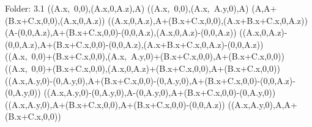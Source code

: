 Folder: 3.1
\left(\left(A.x,\ 0,0\right),\left(A.x,0,A.z\right),A\right)
\left(\left(A.x,\ 0,0\right),\left(A.x,\ A.y,0\right),A\right)
\left(A,A+\left(B.x+C.x,0,0\right),\left(A.x,0,A.z\right)\right)
\left(\left(A.x,0,A.z\right),A+\left(B.x+C.x,0,0\right),\left(A.x+B.x+C.x,0,A.z\right)\right)
\left(A-\left(0,0,A.z\right),A+\left(B.x+C.x,0,0\right)-\left(0,0,A.z\right),\left(A.x,0,A.z\right)-\left(0,0,A.z\right)\right)
\left(\left(A.x,0,A.z\right)-\left(0,0,A.z\right),A+\left(B.x+C.x,0,0\right)-\left(0,0,A.z\right),\left(A.x+B.x+C.x,0,A.z\right)-\left(0,0,A.z\right)\right)
\left(\left(A.x,\ 0,0\right)+\left(B.x+C.x,0,0\right),\left(A.x,\ A.y,0\right)+\left(B.x+C.x,0,0\right),A+\left(B.x+C.x,0,0\right)\right)
\left(\left(A.x,\ 0,0\right)+\left(B.x+C.x,0,0\right),\left(A.x,0,A.z\right)+\left(B.x+C.x,0,0\right),A+\left(B.x+C.x,0,0\right)\right)
\left(\left(A.x,A.y,0\right)-\left(0,A.y,0\right),A+\left(B.x+C.x,0,0\right)-\left(0,A.y,0\right),A+\left(B.x+C.x,0,0\right)-\left(0,0,A.z\right)-\left(0,A.y,0\right)\right)
\left(\left(A.x,A.y,0\right)-\left(0,A.y,0\right),A-\left(0,A.y,0\right),A+\left(B.x+C.x,0,0\right)-\left(0,A.y,0\right)\right)
\left(\left(A.x,A.y,0\right),A+\left(B.x+C.x,0,0\right),A+\left(B.x+C.x,0,0\right)-\left(0,0,A.z\right)\right)
\left(\left(A.x,A.y,0\right),A,A+\left(B.x+C.x,0,0\right)\right)

